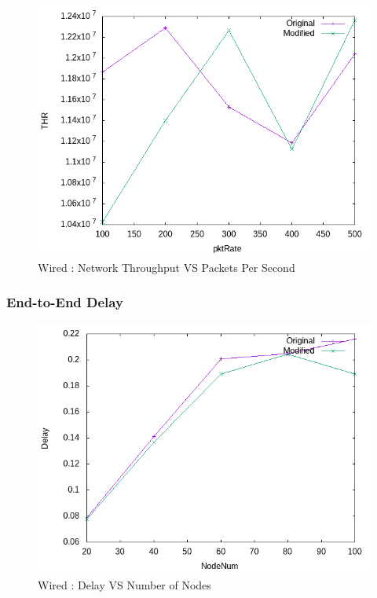     \begin{figure}[!h]
        \centering
        \includegraphics[width=.9\textwidth]{Pictures/Wired/Combined/THRVSpktRate.png}
        \caption{Wired : Network Throughput VS Packets Per Second}
    \end{figure}
    

\newpage
\subsubsection{End-to-End Delay}
    \begin{figure}[!h]
        \centering
        \includegraphics[width=.9\textwidth]{Pictures/Wired/Combined/DelayVSNodeNum.png}
        \caption{Wired : Delay VS Number of Nodes}
    \end{figure}
    
